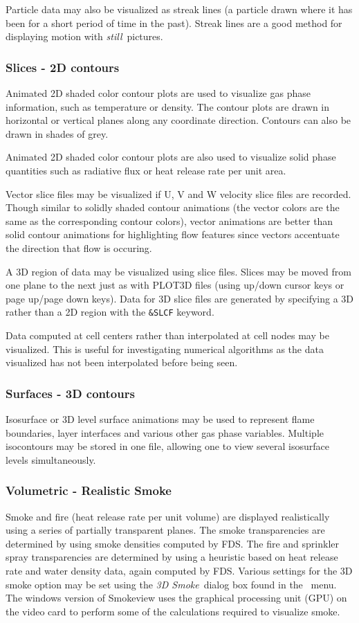 \documentclass[11pt,twoside]{book}
\newcommand{\frameit}[1]{\fbox{\tt #1}}
\begin{document}
Particle data may also be visualized as streak lines (a particle
drawn where it has been for a short period of time in the past).
Streak lines are a good method for displaying motion with
{\em still}\ pictures.


\subsubsection{Slices - 2D contours} Animated 2D shaded color contour plots are
used to visualize gas phase information, such as temperature or
density. The contour plots are drawn in horizontal or vertical
planes along any coordinate direction.  Contours can also be drawn
in shades of grey.

Animated 2D shaded color contour plots are also used to
visualize solid phase quantities such as radiative flux or
heat release rate per unit area.

Vector slice files may be visualized if U, V and W velocity slice files are recorded.
Though
similar to solidly shaded contour animations (the vector colors are
the same as the corresponding contour colors), vector animations are better
than solid contour animations for highlighting flow
features since vectors accentuate the direction that flow is occuring.

A 3D region of
data may be visualized using slice files.  Slices may be moved from one plane to
the next just as with PLOT3D files (using up/down cursor keys or
page up/page down keys).
Data for 3D slice files are generated by specifying a 3D rather than a 2D region with the {\tt \&SLCF} keyword.

Data computed at cell centers rather than interpolated at cell nodes may be visualized.
This is useful for investigating numerical algorithms as the data visualized has not been interpolated before being seen.

\subsubsection{Surfaces - 3D contours}
Isosurface or 3D level surface
animations may be used to represent flame boundaries, layer
interfaces and various other gas phase variables. Multiple
isocontours may be stored in one file, allowing one to
view several isosurface levels simultaneously.

\subsubsection{Volumetric - Realistic Smoke}
Smoke and fire (heat release rate per unit volume)
are displayed
realistically using a series of partially transparent planes.  The
smoke transparencies are determined by using smoke densities
computed by FDS.  The fire and sprinkler spray transparencies are
determined by using a heuristic based on heat release rate and
water density data, again computed by FDS. Various settings for
the 3D smoke option may be set using the {\em 3D Smoke}\ dialog
box found in the \frameit{Dialogs}\ menu.  The windows version of
Smokeview uses the graphical processing unit (GPU) on the video
card to perform some of the calculations required to visualize smoke.
\end{document}
